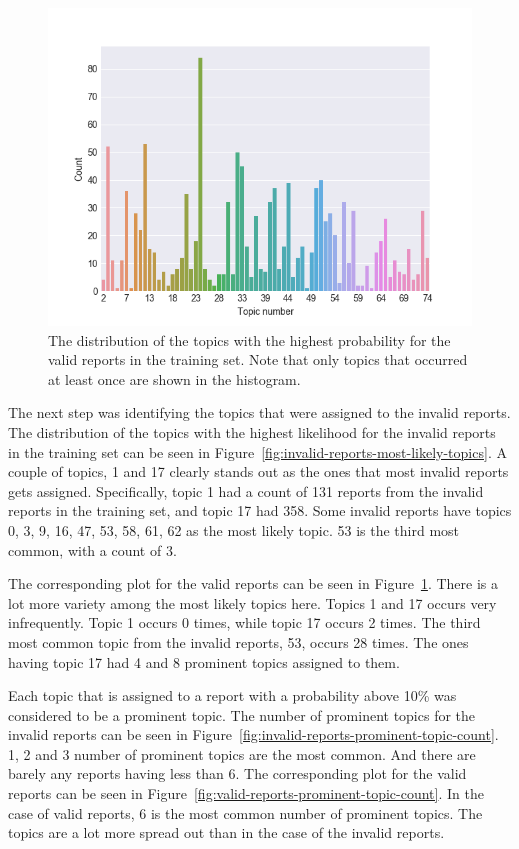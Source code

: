 \begin{figure}[h!]
    \centering
    \includegraphics[scale=0.9]{figures/valid_reports_most_likely_topics_histogram.png}
    \caption{The distribution of the topics with the highest probability for the valid reports in the training set. Note that only topics that occurred at least once are shown in the histogram.}
    \label{fig:valid-reports-most-likely-topics}
\end{figure}

The next step was identifying the topics that were assigned to the invalid reports.
The distribution of the topics with the highest likelihood for the invalid reports in the training set can be seen in Figure~\ref{fig:invalid-reports-most-likely-topics}.
A couple of topics, 1 and 17 clearly stands out as the ones that most invalid reports gets assigned.
Specifically, topic 1 had a count of 131 reports from the invalid reports in the training set, and topic 17 had 358.
Some invalid reports have topics 0, 3, 9, 16, 47, 53, 58, 61, 62 as the most likely topic.
53 is the third most common, with a count of 3.

The corresponding plot for the valid reports can be seen in Figure~\ref{fig:valid-reports-most-likely-topics}.
There is a lot more variety among the most likely topics here.
Topics 1 and 17 occurs very infrequently.
Topic 1 occurs 0 times, while topic 17 occurs 2 times.
The third most common topic from the invalid reports, 53, occurs 28 times.
The ones having topic 17 had 4 and 8 prominent topics assigned to them.

Each topic that is assigned to a report with a probability above 10\% was considered to be a prominent topic.
The number of prominent topics for the invalid reports can be seen in Figure~\ref{fig:invalid-reports-prominent-topic-count}.
1, 2 and 3 number of prominent topics are the most common.
And there are barely any reports having less than 6.
The corresponding plot for the valid reports can be seen in Figure~\ref{fig:valid-reports-prominent-topic-count}.
In the case of valid reports, 6 is the most common number of prominent topics. 
The topics are a lot more spread out than in the case of the invalid reports.

